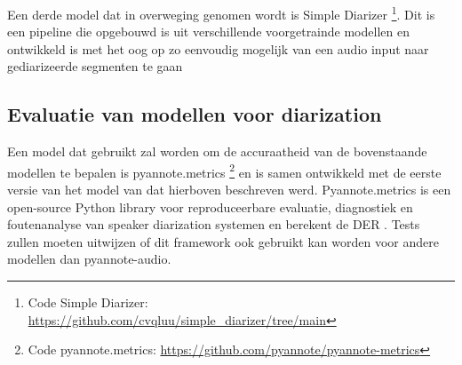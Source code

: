 Een derde model dat in overweging genomen wordt is Simple Diarizer \footnote{Code Simple Diarizer: \url{https://github.com/cvqluu/simple_diarizer/tree/main}}. Dit is een pipeline die opgebouwd is uit verschillende voorgetrainde modellen en ontwikkeld is met het oog op zo eenvoudig mogelijk van een audio input naar gediarizeerde segmenten te gaan \autocite{Chau}

\subsection{Evaluatie van modellen voor diarization}
Een model dat gebruikt zal worden om de accuraatheid van de bovenstaande modellen te bepalen is pyannote.metrics \footnote{Code pyannote.metrics: \url{https://github.com/pyannote/pyannote-metrics}} en is samen ontwikkeld met de eerste versie van het model van \textcite{Bredin2023} dat hierboven beschreven werd. Pyannote.metrics is een open-source Python library voor reproduceerbare evaluatie, diagnostiek en foutenanalyse van speaker diarization systemen en berekent de DER \autocite{Bredin2017}. Tests zullen moeten uitwijzen of dit framework ook gebruikt kan worden voor andere modellen dan pyannote-audio.